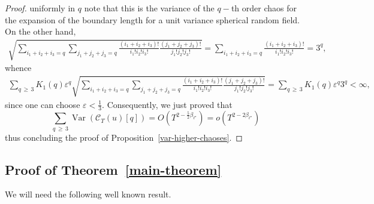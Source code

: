 \documentclass[10pt]{amsart}
\theoremstyle{definition}\newtheorem{defi}[theo]{Definition}\newtheorem{rema}[theo]{Remark}\newtheorem{exam}[theo]{Example}\newtheorem{exem}[theo]{Example}\newtheorem{nota}[theo]{Notation}
\newcommand{\clC}{\mathcal{C}}
\DeclareMathOperator{\Var}{Var}
\begin{document}
\begin{proof}
uniformly in $q$ note that this is the variance of the $q-$th order chaos for the expansion of the boundary length for a unit variance spherical random field. On the other hand,
\begin{align*}
\sqrt{\sum_{i_{1}+i_{2}+i_{3}=q}\sum_{j_{1}+j_{2}+j_{3}=q}\frac{\left(i_{1}+i_{2}+i_{3}\right)!}{i_{1}!i_{2}!i_{3}!}\frac{\left(j_{1}+j_{2}+j_{3}\right)!}{j_{1}!j_{2}!j_{3}!}} 
=\sum_{i_{1}+i_{2}+i_{3}=q}\frac{\left(i_{1}+i_{2}+i_{3}\right)!}{i_{1}!i_{2}!i_{3}!}= 3^{q},
\end{align*}
whence
\begin{align*}
\sum_{q\,\geq\,3}K_{1}(q)\varepsilon^{q}\sqrt{\sum_{i_{1}+i_{2}+i_{3}=q}
\sum_{j_{1}+j_{2}+j_{3}=q}\frac{\left(i_{1}+i_{2}+i_{3}\right)!}{i_{1}!i_{2}!i_{3}!}
\frac{\left(j_{1}+j_{2}+j_{3}\right)!}{j_{1}!j_{2}!j_{3}!}} 
=\sum_{q\,\geq\,3}K_{1}(q)\varepsilon^{q}3^{q}<\infty \text{,}
\end{align*}
since one can choose $\varepsilon <\frac{1}{3}$. Consequently, we just proved that
\begin{equation}\label{var-high}
\sum_{q\,\geq\,3}\Var(\clC_{T}(u)[q])=O\left(T^{2-\frac52
\beta _{\ell ^{\star }}}\right)=o\left(T^{2-2 \beta _{\ell ^{\star }}}\right)
\end{equation}
thus concluding the proof of Proposition~\ref{var-higher-chaoses}.
\end{proof}

\subsection{Proof of Theorem~\ref{main-theorem}}

We will need the following well known result.
\end{document}
